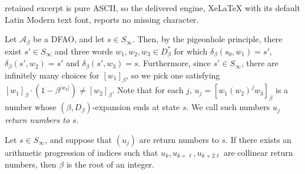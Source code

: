 \documentclass[10pt,a4paper]{amsart}
\newcommand{\ii}{\mathrm{i}}
\begin{document}
retained excerpt is pure ASCII, so the delivered engine, XeLaTeX with its default Latin Modern text font, reports no missing character.
   \begin{definition}\label{def:return-number} Let $\mathcal A_\beta $ be a DFAO, and  let $s\in S_\infty$. Then, by the pigeonhole principle, there exist $s'\in S_\infty$ and three words $w_1,w_2,w_3\in D_\beta^*$ for which
    $\delta_\beta(s_0,w_1)=s'$,  $\delta_\beta(s',w_2)=s'$ and $\delta_\beta(s',w_3)=s$. 
    Furthermore, since $s'\in S_\infty$, there are infinitely many choices for  $[w_1]_\beta$, so we pick one satisfying   $[w_1]_\beta \cdot (1-\beta^{\lvert w_2\rvert}) \ne  [w_2]_\beta$. Note that for each $j$, $u_j=[w_1(w_2)^jw_3]_\beta$ is a number
      whose $(\beta, D_\beta)$-expansion ends at state $s$. 
    We  call such numbers 
      $u_j$ {\em return numbers to $s$}.\end{definition}

\begin{lemma}\label{lem:non-collinearity-1}
    Let $s\in S_\infty$, and  suppose that $(u_j)$  are  return numbers to $s$.
      If there exists an  arithmetic progression of indices such that  $u_k,u_{k+\ell},u_{k+2\ell}$ are collinear return numbers, then $\beta$ is the root of an integer.
\end{lemma}
\end{document}
